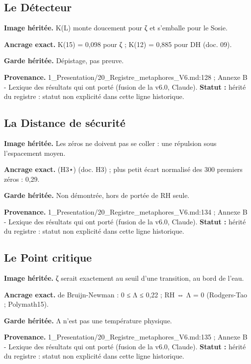 \documentclass[
  9pt,
  a4paper,
]{article}
\begin{document}
\hypertarget{le-duxe9tecteur}{%
\subsection{Le Détecteur}\label{le-duxe9tecteur}}

\textbf{Image héritée.} K(L) monte doucement pour ζ et s'emballe pour le
Sosie.

\textbf{Ancrage exact.} K(15) = 0,098 pour ζ ; K(12) = 0,885 pour DH
(doc. 09).

\textbf{Garde héritée.} Dépistage, pas preuve.

\textbf{Provenance.} 1\_Presentation/20\_Registre\_metaphores\_V6.md:128
; Annexe B - Lexique des résultats qui ont porté (fusion de la v6.0,
Claude). \textbf{Statut :} hérité du registre : statut non explicité
dans cette ligne historique.

\hypertarget{la-distance-de-suxe9curituxe9}{%
\subsection{La Distance de
sécurité}\label{la-distance-de-suxe9curituxe9}}

\textbf{Image héritée.} Les zéros ne doivent pas se coller : une
répulsion sous l'espacement moyen.

\textbf{Ancrage exact.} (H3⋆) (doc. H3) ; plus petit écart normalisé des
300 premiers zéros : 0,29.

\textbf{Garde héritée.} Non démontrée, hors de portée de RH seule.

\textbf{Provenance.} 1\_Presentation/20\_Registre\_metaphores\_V6.md:134
; Annexe B - Lexique des résultats qui ont porté (fusion de la v6.0,
Claude). \textbf{Statut :} hérité du registre : statut non explicité
dans cette ligne historique.

\hypertarget{le-point-critique}{%
\subsection{Le Point critique}\label{le-point-critique}}

\textbf{Image héritée.} ζ serait exactement au seuil d'une transition,
au bord de l'eau.

\textbf{Ancrage exact.} de Bruijn-Newman : 0 ≤ Λ ≤ 0,22 ; RH ⇔ Λ = 0
(Rodgers-Tao ; Polymath15).

\textbf{Garde héritée.} Λ n'est pas une température physique.

\textbf{Provenance.} 1\_Presentation/20\_Registre\_metaphores\_V6.md:135
; Annexe B - Lexique des résultats qui ont porté (fusion de la v6.0,
Claude). \textbf{Statut :} hérité du registre : statut non explicité
dans cette ligne historique.
\end{document}
